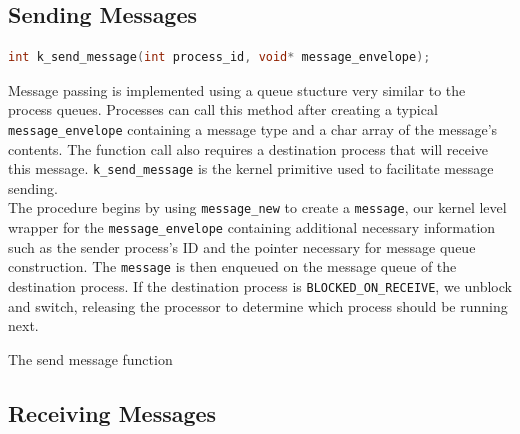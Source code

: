 \documentclass[12pt]{report}
\begin{document}
\subsection{Sending Messages}

\begin{minipage}{\textwidth}
\begin{lstlisting}[language=C, frame=single]
int k_send_message(int process_id, void* message_envelope);
\end{lstlisting}
\end{minipage}

Message passing is implemented using a queue stucture very similar to the process queues. Processes can call this method after creating a typical {\tt message_envelope} containing a message type and a char array of the message's contents. The function call also requires a destination process that will receive this message. {\tt k\_send\_message} is the kernel primitive used to facilitate message sending.\\

The procedure begins by using {\tt message\_new} to create a {\tt message}, our kernel level wrapper for the {\tt message_envelope} containing additional necessary information such as the sender process's ID and the pointer necessary for message queue construction. The {\tt message} is then enqueued on the message queue of the destination process. If the destination process is {\tt BLOCKED\_ON\_RECEIVE}, we unblock and switch, releasing the processor to determine which process should be running next. \\

\begin{algorithm}
  \caption{The send message function}
  \begin{algorithmic}[1]
      
		\EndIf
    \EndProcedure
  \end{algorithmic}
\end{algorithm}

\subsection{Receiving Messages}
\end{document}
